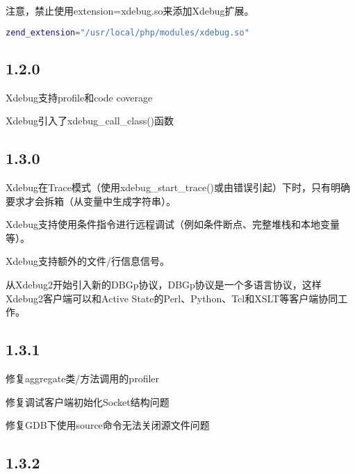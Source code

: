 注意，禁止使用extension=xdebug.so来添加Xdebug扩展。

\begin{lstlisting}[language=bash]
zend_extension="/usr/local/php/modules/xdebug.so"
\end{lstlisting}




\subsection{1.2.0}

\begin{compactitem}
\item Xdebug支持profile和code coverage
\item Xdebug引入了xdebug\_call\_class()函数
\end{compactitem}

\subsection{1.3.0}

\begin{compactitem}
\item Xdebug在Trace模式（使用xdebug\_start\_trace()或由错误引起）下时，只有明确要求才会拆箱（从变量中生成字符串）。
\item Xdebug支持使用条件指令进行远程调试（例如条件断点、完整堆栈和本地变量等）。
\item Xdebug支持额外的文件/行信息信号。
\end{compactitem}

从Xdebug2开始引入新的DBGp协议，DBGp协议是一个多语言协议，这样Xdebug2客户端可以和Active State的Perl、Python、Tcl和XSLT等客户端协同工作。

\subsection{1.3.1}

\begin{compactitem}
\item 修复aggregate类/方法调用的profiler
\item 修复调试客户端初始化Socket结构问题
\item 修复GDB下使用source命令无法关闭源文件问题
\end{compactitem}



\subsection{1.3.2}

